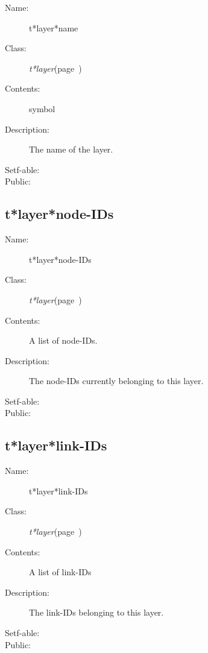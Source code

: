 \begin{description}
\item [Name:]  t*layer*name

\item [Class:] {\sl t*layer}\hfill(page~\pageref{t*layer})

\item [Contents:]
symbol

\item [Description:]
The name of the layer.

\item [Setf-able:]


\item [Public:]



\end{description}
\horizontalline

\subsection{t*layer*node-IDs}
\label{t*layer*node-IDs}

\begin{description}
\item [Name:]  t*layer*node-IDs

\item [Class:] {\sl t*layer}\hfill(page~\pageref{t*layer})

\item [Contents:]
A list of node-IDs.

\item [Description:]

The node-IDs currently belonging to this layer.

\item [Setf-able:]


\item [Public:]



\end{description}
\horizontalline

\subsection{t*layer*link-IDs}
\label{t*layer*link-IDs}

\begin{description}
\item [Name:]  t*layer*link-IDs

\item [Class:] {\sl t*layer}\hfill(page~\pageref{t*layer})

\item [Contents:] 
A list of link-IDs

\item [Description:]

The link-IDs belonging to this layer.

\item [Setf-able:]


\item [Public:]



\end{description}
\horizontalline

